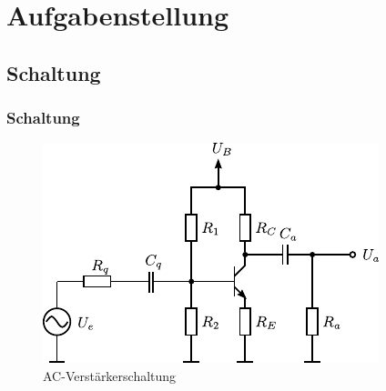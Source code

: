 \section{Aufgabenstellung}

\subsection{Schaltung}

\begin{frame}
	\frametitle{Schaltung}
	\begin{figure}
		\centering
		\includegraphics[scale=1.2]{ac-amp.pdf}
		\caption{AC-Verstärkerschaltung}
	\end{figure}
\end{frame}
